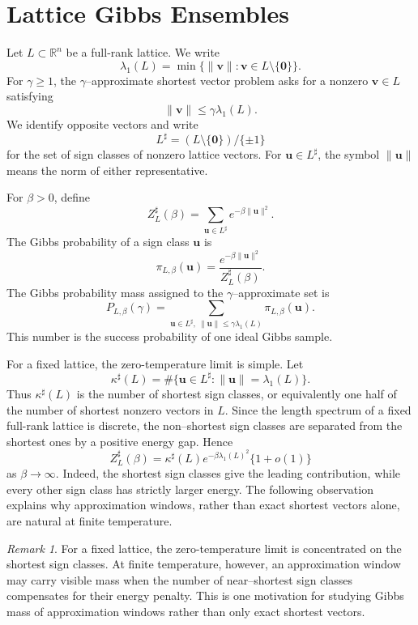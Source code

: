\documentclass[a4paper,12pt]{article}
\theoremstyle{definition}
\theoremstyle{remark}
\newtheorem{rem}[thm]{Remark}
\newcommand{\re}{\mathbb R}
\begin{document}
\section{Lattice Gibbs Ensembles}
\label{sec:gibbs}

Let $L\subset\re^n$ be a full-rank lattice.
We write
$$
\lambda_1(L)=\min\{\|\bm v\|:\bm v\in L\setminus\{\bm 0\}\}.
$$
For $\gamma\ge1$, the $\gamma$--approximate shortest vector problem asks for a nonzero $\bm v\in L$ satisfying
$$
\|\bm v\|\le\gamma\lambda_1(L).
$$
We identify opposite vectors and write
$$
L^\sharp=(L\setminus\{\bm 0\})/\{\pm1\}
$$
for the set of sign classes of nonzero lattice vectors.
For $\bm u\in L^\sharp$, the symbol $\|\bm u\|$ means the norm of either representative.

For $\beta>0$, define
$$
Z_L^\sharp(\beta)=\sum_{\bm u\in L^\sharp}e^{-\beta\|\bm u\|^2}.
$$
The Gibbs probability of a sign class $\bm u$ is
$$
\pi_{L,\beta}(\bm u)=
\frac{e^{-\beta\|\bm u\|^2}}{Z_L^\sharp(\beta)}.
$$
The Gibbs probability mass assigned to the $\gamma$--approximate set is
$$
P_{L,\beta}(\gamma)=
\sum_{\bm u\in L^\sharp,\ \|\bm u\|\le\gamma\lambda_1(L)}
\pi_{L,\beta}(\bm u).
$$
This number is the success probability of one ideal Gibbs sample.

For a fixed lattice, the zero-temperature limit is simple.
Let
$$
\kappa^\sharp(L)
=
\#\{\bm u\in L^\sharp:\|\bm u\|=\lambda_1(L)\}.
$$
Thus $\kappa^\sharp(L)$ is the number of shortest sign classes, or equivalently one half of the number of shortest nonzero vectors in $L$.
Since the length spectrum of a fixed full-rank lattice is discrete, the non--shortest sign classes are separated from the shortest ones by a positive energy gap.
Hence
$$
Z_L^\sharp(\beta)
=
\kappa^\sharp(L)e^{-\beta\lambda_1(L)^2}
\{1+o(1)\}
$$
as $\beta\to\infty$.
Indeed, the shortest sign classes give the leading contribution, while every other sign class has strictly larger energy.
The following observation explains why approximation windows, rather than exact
shortest vectors alone, are natural at finite temperature.

\begin{rem}
For a fixed lattice, the zero-temperature limit is concentrated on the
shortest sign classes.
At finite temperature, however, an approximation window may carry visible mass
when the number of near--shortest sign classes compensates for their energy
penalty.
This is one motivation for studying Gibbs mass of approximation windows rather
than only exact shortest vectors.
\end{rem}
\end{document}
